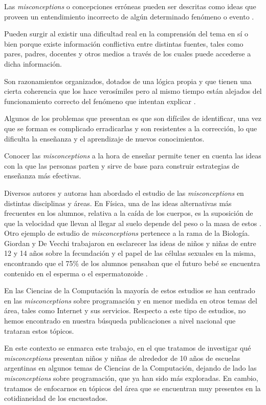 Las \textit{misconceptions} o concepciones erróneas pueden ser descritas como ideas que proveen un entendimiento incorrecto de algún determinado fenómeno o evento \cite{thompson}. 

Pueden surgir al existir una dificultad real en la comprensión del tema en sí o bien porque existe información conflictiva entre distintas fuentes, tales como pares, padres, docentes y otros medios a través de los cuales puede accederse a dicha información. 

Son razonamientos organizados, dotados de una lógica propia y que tienen una cierta coherencia que los hace verosímiles pero al mismo tiempo están alejados del funcionamiento correcto del fenómeno que intentan explicar \cite{johsua}. 

Algunos de los problemas que presentan es que son difíciles de identificar, una vez que se forman es complicado erradicarlas y son resistentes a la corrección, lo que dificulta la enseñanza y el aprendizaje de nuevos conocimientos. 

Conocer las \textit{misconceptions} a la hora de enseñar permite tener en cuenta las ideas con la que las personas parten y sirve de base para construir estrategias de enseñanza más efectivas.

Diversos autores y autoras han abordado el estudio de las \textit{misconceptions} en distintas disciplinas y áreas. En Física, una de las ideas alternativas más frecuentes en los alumnos, relativa a la caída de los cuerpos, es la suposición de que la velocidad que llevan al llegar al suelo depende del peso o la masa de estos \cite{ayensa}. Otro ejemplo de estudio de \textit{misconceptions} pertenece a la rama de la Biología. Giordan y De Vecchi trabajaron en esclarecer las ideas de niños y niñas de entre 12 y 14 años sobre la fecundación y el papel de las células sexuales en la misma, encontrando que el 75\% de los alumnos pensaban que el futuro bebé se encuentra contenido en el esperma o el espermatozoide \cite{johsua}.

En las Ciencias de la Computación la mayoría de estos estudios se han centrado en las \textit{misconceptions} sobre programación y en menor medida en otros temas del área, tales como Internet y sus servicios. Respecto a este tipo de estudios, no hemos encontrado en nuestra búsqueda publicaciones a nivel nacional que trataran estos tópicos.

En este contexto se enmarca este trabajo, en el que tratamos de investigar qué \textit{misconceptions} presentan niños y niñas de alrededor de 10 años de escuelas argentinas en algunos temas de Ciencias de la Computación, dejando de lado las \textit{misconceptions} sobre programación, que ya han sido más exploradas. En cambio, tratamos de enfocarnos en tópicos del área que se encuentran muy presentes en la cotidianeidad de los encuestados. 

